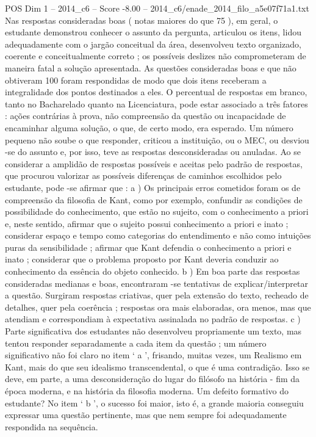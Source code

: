 \begin{textsample}{POS Dim 1 – 2014\_c6 – Score -8.00 – 2014\_c6/enade\_2014\_filo\_a5e07f71a1.txt}
Nas respostas consideradas boas ( notas maiores do que 75 ), em geral, o estudante demonstrou conhecer o assunto da pergunta, articulou os itens, lidou adequadamente com o jargão conceitual da área, desenvolveu texto organizado, coerente e conceitualmente correto ; os possíveis deslizes não comprometeram de maneira fatal a solução apresentada.
As questões consideradas boas e que não obtiveram 100 foram respondidas de modo que dois itens receberam a integralidade dos pontos destinados a eles.
O percentual de respostas em branco, tanto no Bacharelado quanto na Licenciatura, pode estar associado a três fatores : ações contrárias à prova, não compreensão da questão ou incapacidade de encaminhar alguma solução, o que, de certo modo, era esperado.
Um número pequeno não soube o que responder, criticou a instituição, ou o MEC, ou desviou -se do assunto e, por isso, teve as respostas desconsideradas ou anuladas.
Ao se considerar a amplidão de respostas possíveis e aceitas pelo padrão de respostas, que procurou valorizar as possíveis diferenças de caminhos escolhidos pelo estudante, pode -se afirmar que : a ) Os principais erros cometidos foram os de compreensão da filosofia de Kant, como por exemplo, confundir as condições de possibilidade do conhecimento, que estão no sujeito, com o conhecimento a priori e, neste sentido, afirmar que o sujeito possui conhecimento a priori e inato ; considerar espaço e tempo como categorias do entendimento e não como intuições puras da sensibilidade ; afirmar que Kant defendia o conhecimento a priori e inato ; considerar que o problema proposto por Kant deveria conduzir ao conhecimento da essência do objeto conhecido. b ) Em boa parte das respostas consideradas medianas e boas, encontraram -se tentativas de explicar/interpretar a questão.
Surgiram respostas criativas, quer pela extensão do texto, recheado de detalhes, quer pela coerência ; respostas ora mais elaboradas, ora menos, mas que atendiam e correspondiam à expectativa assinalada no padrão de respostas. c ) Parte significativa dos estudantes não desenvolveu propriamente um texto, mas tentou responder separadamente a cada item da questão ; um número significativo não foi claro no item ‘ a ’, frisando, muitas vezes, um Realismo em Kant, mais do que seu idealismo transcendental, o que é uma contradição.
Isso se deve, em parte, a uma desconsideração do lugar do filósofo na história - fim da época moderna, e na história da filosofia moderna.
Um defeito formativo do estudante?
No item ‘ b ’, o sucesso foi maior, isto é, a grande maioria conseguiu expressar uma questão pertinente, mas que nem sempre foi adequadamente respondida na sequência.

\end{textsample}
